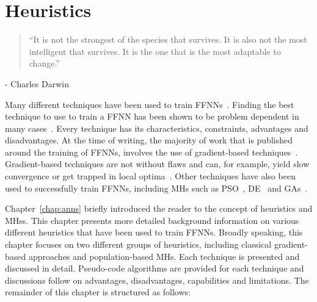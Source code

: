 \chapter{Heuristics}\label{chap:heuristics}

\begin{quotation}
	``It is not the strongest of the species that survives. It is also not the most intelligent that survives. It is the one that is the most adaptable to change.''
\end{quotation}
\begin{flushright}
	- Charles Darwin
\end{flushright}

Many different techniques have been used to train \acp{FFNN}~\cite{ref:kingma:2014}. Finding the best technique to use to train a \acs{FFNN} has been shown to be problem dependent in many cases~\cite{ref:kheiri:2017}. Every technique has its characteristics, constraints, advantages and disadvantages. At the time of writing, the majority of work that is published around the training of \acp{FFNN}, involves the use of gradient-based techniques~\cite{ref:nel:2021}. Gradient-based techniques are not without flaws and can, for example, yield slow convergence or get trapped in local optima~\cite{ref:mingguang:2009}. Other techniques have also been used to successfully train \acp{FFNN}, including \acp{MH} such as \acf{PSO}~\cite{ref:rakitianskaia:2012, ref:vanwyk:2014}, \acf{DE}~\cite{ref:espinal:2011} and \acfp{GA}~\cite{ref:gupta:1999}.

Chapter~\ref{chap:anns} briefly introduced the reader to the concept of heuristics and \acfp{MH}s. This chapter presents more detailed background information on various different heuristics that have been used to train \acp{FFNN}. Broadly speaking, this chapter focuses on two different groups of heuristics, including classical gradient-based approaches and population-based \acp{MH}. Each technique is presented and discussed in detail. Pseudo-code algorithms are provided for each technique and discussions follow on advantages, disadvantages, capabilities and limitations. The remainder of this chapter is structured as follows:

